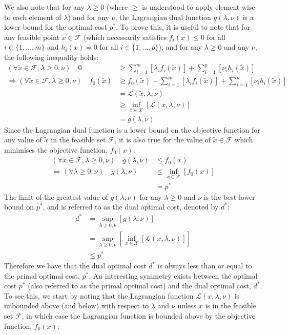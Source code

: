 We also note that for any $\lambda \ge 0$ (where $\ge$ is understood to apply element-wise to each element of $\lambda$) and for any $\nu$, the Lagrangian dual function $g(\lambda, \nu)$ is a lower bound for the optimal cost $p^*$. To prove this, it is useful to note that for any feasible point $\tilde{x}\in\mathcal{F}$ (which necessarily satisfies $f_i(x) \le 0$ for all $i\in\{1, \hdots, m\}$ and $h_i(x) = 0$ for all $i\in\{1, \hdots, p\}$), and for any $\lambda\ge 0$ and any $\nu$, the following inequality holds:
\begin{align}
    (\forall \tilde{x} \in \mathcal{F}, \lambda \ge 0, \nu) \quad 0 &\ge \sum_{i=1}^{m}[\lambda_i f_i(\tilde{x})] + \sum_{i=1}^{p}[\nu_i h_i(\tilde{x})] \\
    \Rightarrow (\forall \tilde{x} \in \mathcal{F}, \lambda \ge 0, \nu) \quad f_0(\tilde{x}) &\ge f_0(\tilde{x}) + \sum_{i=1}^{m}[\lambda_i f_i(\tilde{x})] + \sum_{i=1}^{p}[\nu_i h_i(\tilde{x})] \\
    &= \mathcal{L}(\tilde{x}, \lambda, \nu) \\
    &\ge \underset{x\in\mathcal{X}}{\inf}\left[\mathcal{L}(x, \lambda, \nu)\right] \\
    &= g(\lambda, \nu)
\end{align}
Since the Lagrangian dual function is a lower bound on the objective function for any value of $\tilde{x}$ in the feasible set $\mathcal{F}$, it is also true for the value of $\tilde{x} \in \mathcal{F}$ which minimises the objective function, $f_0(x)$:
\begin{align}
    (\forall \tilde{x} \in \mathcal{F}, \lambda \ge 0, \nu) \quad g(\lambda, \nu) &\le f_0(\tilde{x}) \\
    \Rightarrow (\forall \lambda \ge 0, \nu) \quad g(\lambda, \nu) &\le \underset{x\in\mathcal{F}}{\inf}\left[f_0(x)\right] \\
    &= p^*
\end{align}
The limit of the greatest value of $g(\lambda, \nu)$ for any $\lambda \ge 0$ and $\nu$ is the best lower bound on $p^*$, and is referred to as the dual optimal cost, denoted by $d^*$:
\begin{align}
    d^* &= \underset{\lambda \ge 0, \nu}{\sup}\left[g(\lambda, \nu)\right] \\
    &= \underset{\lambda \ge 0, \nu}{\sup}\left[\underset{x\in\mathcal{X}}{\inf}\left[\mathcal{L}(x, \lambda, \nu)\right]\right] \\
    & \le p^*
\end{align}
Therefore we have that the dual optimal cost $d^*$ is always less than or equal to the primal optimal cost, $p^*$. An interesting symmetry exists between the optimal cost $p^*$ (also referred to as the primal optimal cost) and the dual optimal cost, $d^*$. To see this, we start by noting that the Lagrangian function $\mathcal{L}(x, \lambda, \nu)$ is unbounded above (and below) with respect to $\lambda$ and $\nu $ unless $x$ is in the feasible set $\mathcal{F}$, in which case the Lagrangian function is bounded above by the objective function, $f_0(x)$:
